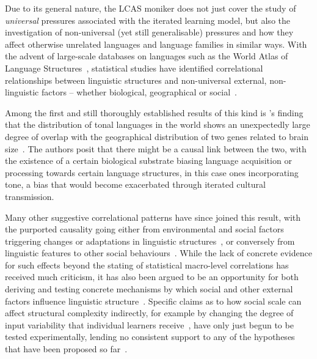 Due to its general nature, the LCAS moniker does not just cover the study of \emph{universal} pressures associated with the iterated learning model, but also the investigation of non-universal (yet still generalisable) pressures and how they affect otherwise unrelated languages and language families in similar ways.
With the advent of large-scale databases on languages such as the World Atlas of Language Structures~\citep[WALS][]{WALS2013}, statistical studies have identified correlational relationships between linguistic structures and non-universal external, non-linguistic factors -- whether biological, geographical or social~\citep{Ladd2015}.

Among the first and still thoroughly established results of this kind is \citeauthor{Dediu2007}'s finding that the distribution of tonal languages in the world shows an unexpectedly large degree of overlap with the geographical distribution of two genes related to brain size~\citeyearpar{Dediu2007}. The authors posit that there might be a causal link between the two, with the existence of a certain biological substrate biasing language acquisition or processing towards certain language structures, in this case ones incorporating tone, a bias that would become exacerbated through iterated cultural transmission.

Many other suggestive correlational patterns have since joined this result, with the purported causality going either from environmental and social factors triggering changes or adaptations in linguistic structures~\citep{Hay2007,Lupyan2010}, or conversely from linguistic features to other social behaviours~\citep{Chen2013}. While the lack of concrete evidence for such effects beyond the stating of statistical macro-level correlations has received much criticism, it has also been argued to be an opportunity for both deriving and testing concrete mechanisms by which social and other external factors influence linguistic structure~\citep{Roberts2012,Nettle2012,Roberts2013correlation}. Specific claims as to how social scale can affect structural complexity indirectly, for example by changing the degree of input variability that individual learners receive~\citep{Wray2007}, have only just begun to be tested experimentally, lending no consistent support to any of the hypotheses that have been proposed so far~\citep{Atkinson2015,Atkinson2016}.

